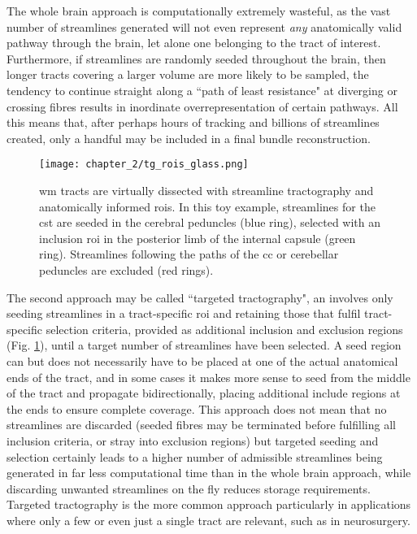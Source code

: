 The whole brain approach is computationally extremely wasteful, as the vast number of streamlines generated will not even represent \textit{any} anatomically valid pathway through the brain, let alone one belonging to the tract of interest.
Furthermore, if streamlines are randomly seeded throughout the brain, then longer tracts covering a larger volume are more likely to be sampled, the tendency to continue straight along a ``path of least resistance" at diverging or crossing fibres results in inordinate overrepresentation of certain pathways\autocite{Smith2013}.
All this means that, after perhaps hours of tracking and billions of streamlines created, only a handful may be included in a final bundle reconstruction.

\begin{figure}
  \texttt{[image: chapter\_2/tg\_rois\_glass.png]}
  \caption{\gls{wm} tracts are virtually dissected with streamline tractography and anatomically informed \glspl{roi}. In this toy example, streamlines for the \gls{cst} are seeded in the cerebral peduncles (blue ring), selected with an inclusion \gls{roi} in the posterior limb of the internal capsule (green ring). Streamlines following the paths of the \gls{cc} or cerebellar peduncles are excluded (red rings).}
  \label{fig:tg_rois}
\end{figure}

The second approach may be called ``targeted tractography", an involves only seeding streamlines in a tract-specific \gls{roi} and retaining those that fulfil tract-specific selection criteria, provided as additional inclusion and exclusion regions (Fig. \ref{fig:tg_rois}), until a target number of streamlines have been selected.
A seed region can but does not necessarily have to be placed at one of the actual anatomical ends of the tract, and in some cases it makes more sense to seed from the middle of the tract and propagate bidirectionally, placing additional include regions at the ends to ensure complete coverage.
This approach does not mean that no streamlines are discarded (seeded fibres may be terminated before fulfilling all inclusion criteria, or stray into exclusion regions) but targeted seeding and selection certainly leads to a higher number of admissible streamlines being generated in far less computational time than in the whole brain approach, while discarding unwanted streamlines on the fly reduces storage requirements.
Targeted tractography is the more common approach particularly in applications where only a few or even just a single tract are relevant, such as in neurosurgery\autocite{Yang2021}. 

